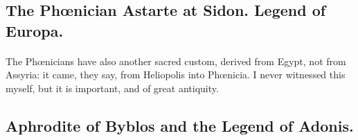 \documentclass[a4paper, 11pt, oneside, polutonikogreek, english]{article}
\begin{document}
\subsection{The Phœnician Astarte at Sidon. Legend of Europa.}
\paragraph{}
The Phœnicians have also another sacred custom, derived from Egypt, not from Assyria: it came, they say, from Heliopolis into Phœnicia. I never witnessed this myself, but it is important, and of great antiquity.

\subsection{Aphrodite of Byblos and the Legend of Adonis.}
\end{document}
